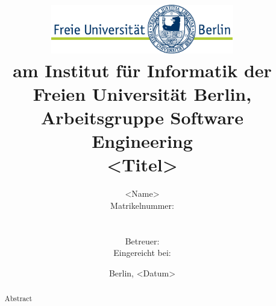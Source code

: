 \documentclass[11pt,a4paper,ngerman]{article}
\title{\includegraphics[width=0.6\textwidth]{pictures/logo}\\
{\normalsize <X-Arbeit> am Institut für Informatik der Freien Universität 
Berlin, Arbeitsgruppe Software Engineering}\\[6ex]
<Titel>}
\author{<Name>\\
{\normalsize Matrikelnummer: }\\
{\normalsize \mailto{example@mail.de}}\\\\
{\normalsize Betreuer: }\\
{\normalsize Eingereicht bei: }}
\date{Berlin, <Datum>}
\begin{document}
\begin{titlepage}

\maketitle
\thispagestyle{empty}

\vfill{}

\begin{abstract}
Abstract
\end{abstract}

\vfill{}

\end{titlepage}

\pagestyle{empty}
\clearpage{}



\tableofcontents

\clearpage{}
\pagestyle{fancy}
\setcounter{page}{1}





\appendix




\end{document}

